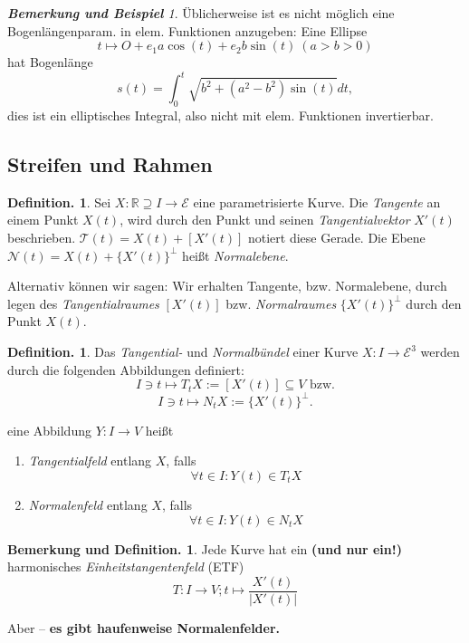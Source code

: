 \documentclass[a4paper,oneside,11pt,DIV=12,parskip=half]{scrartcl}
\newcommand{\R}{\mathbb R}
\newcommand{\E}{\mathcal E}
\theoremstyle{plain}
\theoremstyle{definition}
\newtheorem{definition}[theorem]{Definition.}
\newtheorem{remark, definition}[theorem]{Bemerkung und Definition.}
\newtheorem{lemma, definition}[theorem]{Lemma und Definition.}
\theoremstyle{remark}
\newtheorem*{remark, example}{\textbf{Bemerkung und Beispiel}}
\begin{document}
\begin{remark, example}
	
	Üblicherweise ist es nicht möglich eine Bogenlängenparam. in elem. Funktionen anzugeben: Eine Ellipse\[t \mapsto O + e_1a\cos(t)+e_2b\sin(t) ~ (a>b>0)\]
	hat Bogenlänge
	\[s(t) = \int_{0}^{t} \sqrt{b^2 + ( a^2-b^2)\sin(t)}dt,\]
	dies ist ein elliptisches Integral, also nicht mit elem. Funktionen invertierbar.

\end{remark, example}

\subsection{Streifen und Rahmen}

\begin{definition}
	
	Sei $X: \R \supseteq I \rightarrow \E$ eine parametrisierte Kurve.
	Die \emph{Tangente} an einem Punkt $X(t)$, wird durch den Punkt und seinen \emph{Tangentialvektor} $X'(t)$ beschrieben. $\mathcal{T}(t)=X(t) + [X'(t)]$ notiert diese Gerade.
	Die Ebene $\mathcal{N}(t)=X(t)+ \{X'(t)\}^\perp $ heißt \emph{Normalebene}.
	
	Alternativ können wir sagen: Wir erhalten Tangente, bzw. Normalebene, durch legen des \emph{Tangentialraumes} $[X'(t)]$ bzw. \emph{Normalraumes} $\{X'(t)\}^\perp$ durch den Punkt $X(t)$.
	
\end{definition}

\begin{definition}
	Das \emph{Tangential-} und \emph{Normalbündel} einer Kurve $X:I \rightarrow \E^3$ werden durch die folgenden Abbildungen definiert:
	\[I \ni t \mapsto T_tX := [X'(t)]\subseteq V \text{ bzw.}\]
	\[I \ni t \mapsto N_tX:= \{ X'(t) \}^\perp. \]
	
	eine Abbildung $Y: I \rightarrow V$ heißt
	\begin{enumerate}
		\item \emph{Tangentialfeld} entlang $X$, falls \[ \forall t \in I: Y(t) \in T_tX \]
		\item \emph{Normalenfeld} entlang $X$, falls \[  \forall t \in I: Y(t) \in N_tX \]
	\end{enumerate}
\end{definition}

\begin{remark, definition}

Jede Kurve hat ein \textbf{(und nur ein!)} harmonisches \emph{Einheitstangentenfeld} (ETF)
\[ T: I \rightarrow V; t \mapsto \frac{X'(t)}{|X'(t)|} \]

Aber -- \textbf{es gibt haufenweise Normalenfelder.}

\end{remark, definition}
\end{document}
